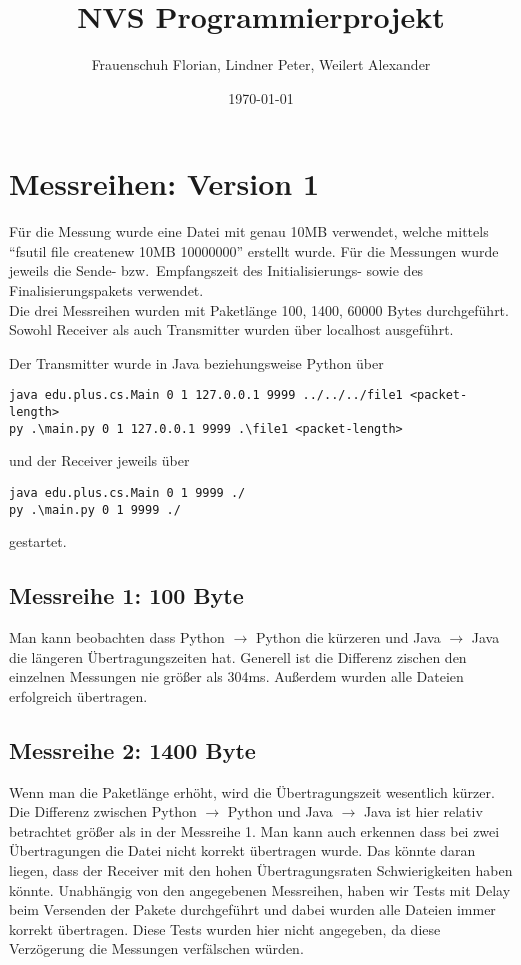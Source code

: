 \documentclass{article}
\title{NVS Programmierprojekt}
\author{Frauenschuh Florian, Lindner Peter, Weilert Alexander}
\date{\today}
\begin{document}
    \maketitle

    \section{Messreihen: Version 1}\label{sec:messreihen:-version-1}
    Für die Messung wurde eine Datei mit genau 10MB verwendet, welche mittels \enquote{fsutil file createnew 10MB 10000000} erstellt wurde.
    Für die Messungen wurde jeweils die Sende- bzw.\ Empfangszeit des Initialisierungs- sowie des Finalisierungspakets verwendet. \\
    Die drei Messreihen wurden mit Paketlänge 100, 1400, 60000 Bytes durchgeführt. \\
    Sowohl Receiver als auch Transmitter wurden über localhost ausgeführt.

    Der Transmitter wurde in Java beziehungsweise Python über
    \begin{lstlisting}
java edu.plus.cs.Main 0 1 127.0.0.1 9999 ../../../file1 <packet-length>
py .\main.py 0 1 127.0.0.1 9999 .\file1 <packet-length>
    \end{lstlisting}und der Receiver jeweils über
    \begin{lstlisting}
java edu.plus.cs.Main 0 1 9999 ./
py .\main.py 0 1 9999 ./
    \end{lstlisting}
    gestartet.

    \subsection{Messreihe 1: 100 Byte}\label{subsec:messreihe-1:-100-byte}
    Man kann beobachten dass Python $\rightarrow$ Python die kürzeren und Java $\rightarrow$ Java die längeren Übertragungszeiten hat.
    Generell ist die Differenz zischen den einzelnen Messungen nie größer als 304ms.
    Außerdem wurden alle Dateien erfolgreich übertragen.

    \subsection{Messreihe 2: 1400 Byte}\label{subsec:messreihe-2:-1400-byte}
    Wenn man die Paketlänge erhöht, wird die Übertragungszeit wesentlich kürzer.
    Die Differenz zwischen Python $\rightarrow$ Python und Java $\rightarrow$ Java ist hier relativ betrachtet größer als in der Messreihe 1.
    Man kann auch erkennen dass bei zwei Übertragungen die Datei nicht korrekt übertragen wurde.
    Das könnte daran liegen, dass der Receiver mit den hohen Übertragungsraten Schwierigkeiten haben könnte.
    Unabhängig von den angegebenen Messreihen, haben wir Tests mit Delay beim Versenden der Pakete durchgeführt und dabei wurden alle Dateien immer korrekt übertragen.
    Diese Tests wurden hier nicht angegeben, da diese Verzögerung die Messungen verfälschen würden.
\end{document}
